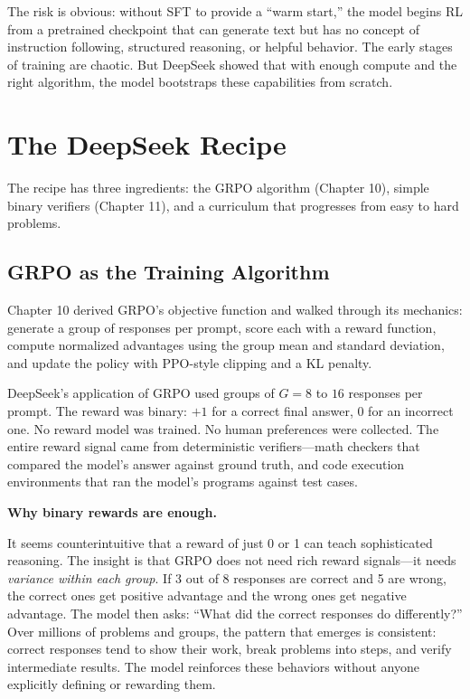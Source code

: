 \begin{chapterenv}
The risk is obvious: without SFT to provide a ``warm start,'' the model begins RL from a pretrained checkpoint that can generate text but has no concept of instruction following, structured reasoning, or helpful behavior. The early stages of training are chaotic. But DeepSeek showed that with enough compute and the right algorithm, the model bootstraps these capabilities from scratch.

\section{The DeepSeek Recipe}

The recipe has three ingredients: the GRPO algorithm (Chapter 10), simple binary verifiers (Chapter 11), and a curriculum that progresses from easy to hard problems.

\subsection{GRPO as the Training Algorithm}

Chapter 10 derived GRPO's objective function and walked through its mechanics: generate a group of responses per prompt, score each with a reward function, compute normalized advantages using the group mean and standard deviation, and update the policy with PPO-style clipping and a KL penalty.

DeepSeek's application of GRPO used groups of $G = 8$ to $16$ responses per prompt. The reward was binary: $+1$ for a correct final answer, $0$ for an incorrect one. No reward model was trained. No human preferences were collected. The entire reward signal came from deterministic verifiers---math checkers that compared the model's answer against ground truth, and code execution environments that ran the model's programs against test cases.

\begin{infobox}
\textbf{Why binary rewards are enough.}

It seems counterintuitive that a reward of just 0 or 1 can teach sophisticated reasoning. The insight is that GRPO does not need rich reward signals---it needs \textit{variance within each group}. If 3 out of 8 responses are correct and 5 are wrong, the correct ones get positive advantage and the wrong ones get negative advantage. The model then asks: ``What did the correct responses do differently?'' Over millions of problems and groups, the pattern that emerges is consistent: correct responses tend to show their work, break problems into steps, and verify intermediate results. The model reinforces these behaviors without anyone explicitly defining or rewarding them.
\end{infobox}


\end{chapterenv}
